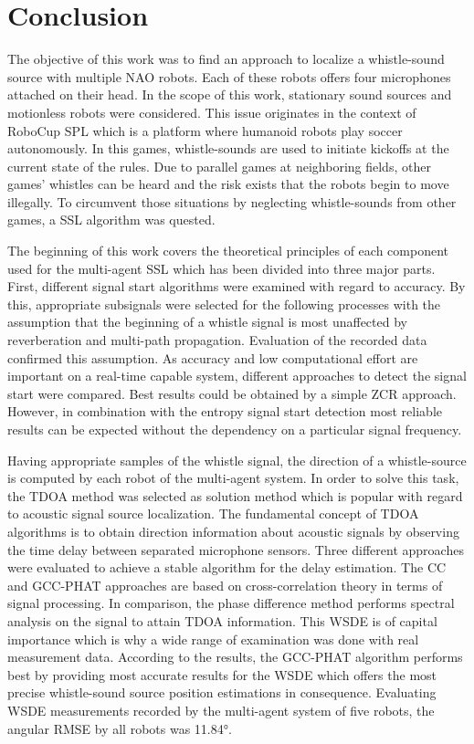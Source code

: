 \chapter{Conclusion}
\label{chap:05_conclusion}

The objective of this work was to find an approach to localize a whistle-sound
source with multiple NAO robots.
Each of these robots offers four microphones attached on their head.
In the scope of this work, stationary sound sources and motionless robots were
considered.
This issue originates in the context of \ac{RoboCup} \ac{SPL} which is a
platform where humanoid robots play soccer autonomously.
In this games, whistle-sounds are used to initiate kickoffs at the current state of the rules.
Due to parallel games at neighboring fields, other games' whistles can be heard and
the risk exists that the robots begin to move illegally.
To circumvent those situations by neglecting whistle-sounds from other
games, a \acf{SSL} algorithm was quested.

The beginning of this work covers the theoretical principles of each component
used for the multi-agent \ac{SSL} which has been divided into three major parts.
First, different signal start algorithms were examined with regard to accuracy.
By this, appropriate subsignals were selected for the following processes with the
assumption that the beginning of a whistle signal is most unaffected by
reverberation and multi-path propagation.
Evaluation of the recorded data confirmed this assumption.
As accuracy and low computational effort are important on a real-time capable
system, different approaches to detect the signal start were compared.
Best results could be obtained by a simple \ac{ZCR} approach.
However, in combination with the entropy signal start detection
most reliable results can be expected without the dependency on a
particular signal frequency.

Having appropriate samples of the whistle signal, the direction of a whistle-source
is computed by each robot of the multi-agent system.
In order to solve this task, the \acf{TDOA} method was selected as solution method
which is popular with regard to acoustic signal source localization.
The fundamental concept of \ac{TDOA} algorithms is to obtain direction information
about acoustic signals by observing the time delay between separated microphone sensors.
Three different approaches were evaluated to achieve a stable algorithm for the delay estimation.
The \acf{CC} and \acf{GCC-PHAT} approaches are based on cross-correlation theory in terms
of signal processing.
In comparison, the phase difference method performs spectral analysis on the signal
to attain \ac{TDOA} information.
This \acf{WSDE} is of capital importance which is why a wide range of examination
was done with real measurement data.
According to the results, the \acf{GCC-PHAT} algorithm performs best by
providing most accurate results for the \ac{WSDE} which offers the most precise
whistle-sound source position estimations in consequence.
Evaluating \ac{WSDE} measurements recorded by the multi-agent system of five robots,
the angular \ac{RMSE} by all robots was 11.84\si{\degree}.

